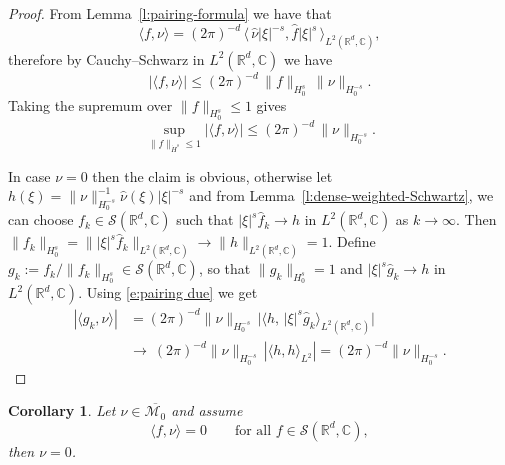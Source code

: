 \documentclass[12pt,a4paper,oneside]{amsart}
\theoremstyle{plain}
\newtheorem{corollary}[theorem]{Corollary}
\theoremstyle{definition}
\numberwithin{equation}{section}
\numberwithin{figure}{section}
\numberwithin{table}{section}
\theoremstyle{remark}
\newcommand{\R}{\mathbb{R}}
\newcommand{\calM}{\mathcal{M}}
\newcommand{\Fhat}[1]{\widehat{#1}}
\begin{document}
\begin{proof}
From Lemma~\ref{l:pairing-formula} we have that
\begin{equation}\label{e:pairing due}
\langle f,\nu\rangle
=(2\pi)^{-d}\,\langle\, \Fhat{\nu}|\xi|^{-s},\Fhat f|\xi|^{s}\,\rangle_{L^2(\R^d,\mathbb{C})},
\end{equation}
therefore by Cauchy--Schwarz in $L^2(\R^d,\mathbb{C})$ we have
\begin{equation}\label{Cauchy-Schwartz sob}
|\langle f,\nu\rangle|
\le (2\pi)^{-d}\,\|f\|_{H_0^{s}}\,\|\nu\|_{H^{-s}_0}.
\end{equation}
Taking the supremum over $\|f\|_{H_0^{s}}\le 1$ gives
\begin{equation*}
\sup_{\|f\|_{\dot H^{s}}\le 1}|\langle f,\nu\rangle|\le (2\pi)^{-d}\,\|\nu\|_{H^{-s}_0}.
\end{equation*}

In case $\nu=0$ then the claim is obvious, otherwise let $h(\xi)={\|\nu\|^{-1}_{H^{-s}_0}}\Fhat{\nu}(\xi)|\xi|^{-s}$ and from Lemma~\ref{l:dense-weighted-Schwartz}, we can choose $f_k\in\mathcal{S}(\R^d,\mathbb{C})$ such that
$|\xi|^{s}\Fhat f_k\to h$ in $L^2(\R^d,\mathbb{C})$ as $k\to\infty$.
Then $\|f_k\|_{H_0^{s}}=\||\xi|^{s}\Fhat f_k\|_{L^2(\R^d,\mathbb{C})}\to\|h\|_{L^2(\R^d,\mathbb{C})}=1$.
Define $g_k:=f_k/\|f_k\|_{H_0^{s}}\in \mathcal{S}(\R^d,\mathbb{C})$, so that $\|g_k\|_{H_0^{s}}=1$ and
$|\xi|^{s}\Fhat g_k\to h$ in $L^2(\R^d,\mathbb{C})$.
Using \eqref{e:pairing due} we get
\begin{align*}
|\langle g_k,\nu\rangle|
&= (2\pi)^{-d}\|\nu\|_{H^{-s}_0}\,
   \bigl|\langle h,\,|\xi|^{s}\Fhat{g}_k\rangle_{L^2(\R^d,\mathbb{C})}\bigr|\\
&\longrightarrow\ 
   (2\pi)^{-d}\|\nu\|_{H^{-s}_0}\,
   |\langle h,h\rangle_{L^2}|
= (2\pi)^{-d}\|\nu\|_{H^{-s}_0}.
\end{align*}
\end{proof}

\begin{corollary}\label{c:Schwartz-separates}
Let $\nu\in \overline{\calM_0}$ and assume
\begin{equation*}
    \langle f,\nu\rangle=0
\qquad\text{for all }f\in\mathcal S(\R^d,\mathbb{C}),
\end{equation*}
then $\nu=0$.
\end{corollary}
\end{document}
